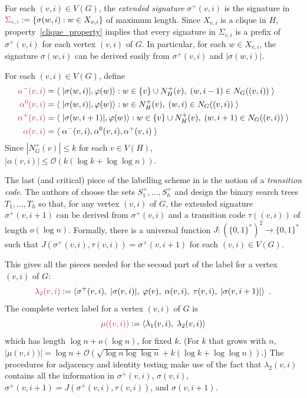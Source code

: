 \documentclass{patmorin}
\makeatletter
\renewcommand{\le}{\leqslant}
\newcommand{\defin}[1]{\emph{\textcolor{brightmaroon}{#1}}}
\def\mathcolor#1#{\@mathcolor{#1}}
\def\@mathcolor#1#2#3{%
  \protect\leavevmode
  \begingroup
    \color#1{#2}#3%
  \endgroup
}
\newcommand{\mathdefin}[1]{\mathcolor{brightmaroon}{#1}}
\newcommand{\Oh}{\calO}
\newcommand{\calO}{\mathcal{O}}
\makeatother
\begin{document}
  For each $(v,i)\in V(G)$, the \defin{extended signature} \defin{$\sigma^+(v,i)$} is the signature in $\mathdefin{\Sigma_{v,i}}:=\{\sigma(w,i):w\in X_{v,i}\}$ of maximum length.  Since $X_{v,i}$ is a clique in $H$, property~\ref{clique_property} implies that every signature in $\Sigma_{v,i}$ is a prefix of $\sigma^+(v,i)$ for each vertex $(v,i)$ of $G$.  In particular, for each $w\in X_{v,i}$, the signature $\sigma(w,i)$ can be derived easily from $\sigma^+(v,i)$ and $|\sigma(w,i)|$.


  For each $(v,i)\in V(G)$, define
  \begin{align*}
    \mathdefin{\alpha^{-}(v,i)} &= \langle\; |\sigma(w,i)|, \varphi(w)\rangle : w\in \{v\}\cup N^+_H(v),\; (w,i-1)\in N_G((v,i)) \;\rangle \\
    \mathdefin{\alpha^{0}(v,i)} &= \langle\; |\sigma(w,i)|, \varphi(w)\rangle : w\in N^+_H(v),\; (w,i)\in N_G((v,i)) \;\rangle \\
    \mathdefin{\alpha^+(v,i)} &= \langle\; |\sigma(w,i+1)|, \varphi(w)\rangle : w\in \{v\}\cup N^+_H(v),\; (w,i+1)\in N_G((v,i)) \;\rangle \\
    \mathdefin{\alpha(v,i)} &= \langle\; \alpha^-(v,i),\alpha^0(v,i),\alpha^+(v,i) \;\rangle \\
  \end{align*}
  Since $|N^+_G(v)|\le k$ for each $v\in V(H)$, $|\alpha(v,i)|\le\Oh(k(\log k + \log\log n))$.

  The last (and critical) piece of the labelling scheme in \cite{dujmovic.esperet.ea:adjacency} is the notion of a \defin{transition code}. The authors of \cite{dujmovic.esperet.ea:adjacency} choose the sets $S^+_1,\ldots,S^+_h$ and design the binary search trees $T_1,\ldots,T_h$ so that, for any vertex $(v,i)$ of $G$, the extended signature $\sigma^+(v,i+1)$ can be derived from $\sigma^+(v,i)$ and a transition code \defin{$\tau((v,i))$} of length $o(\log n)$. Formally, there is a universal function $J:(\{0,1\}^*)^2\to\{0,1\}^*$ such that $J(\sigma^+(v,i),\tau(v,i))=\sigma^+(v,i+1)$ for each $(v,i)\in V(G)$.

  This gives all the pieces needed for the second part of the label for a vertex $(v,i)$ of $G$:
  \[
    \mathdefin{\lambda_2(v,i)} := \langle \sigma^+(v,i),\; |\sigma(v,i)|,\; \varphi(v),\; \alpha(v,i),\; \tau(v,i),\; |\sigma(v,i+1)| \rangle  \enspace .
  \]
  The complete vertex label for a vertex $(v,i)$ of $G$ is
  \[
    \mathdefin{\mu((v,i))} := \langle \lambda_1(v,i),\; \lambda_2(v,i) \rangle
  \]
  which has length $\log n + o(\log n)$, for fixed $k$.  (For $k$ that grows with $n$, $|\mu(v,i))|=\log n + \Oh(\sqrt{\log n\log\log n} + k(\log k + \log\log n))$.)
  The procedures for adjacency and identity testing make use of the fact that $\lambda_2(v,i)$ contains all the information in $\sigma^+(v,i)$, $\sigma(v,i)$, $\sigma^+(v,i+1)=J(\sigma^+(v,i),\tau(v,i))$, and $\sigma(v,i+1)$.
\end{document}
